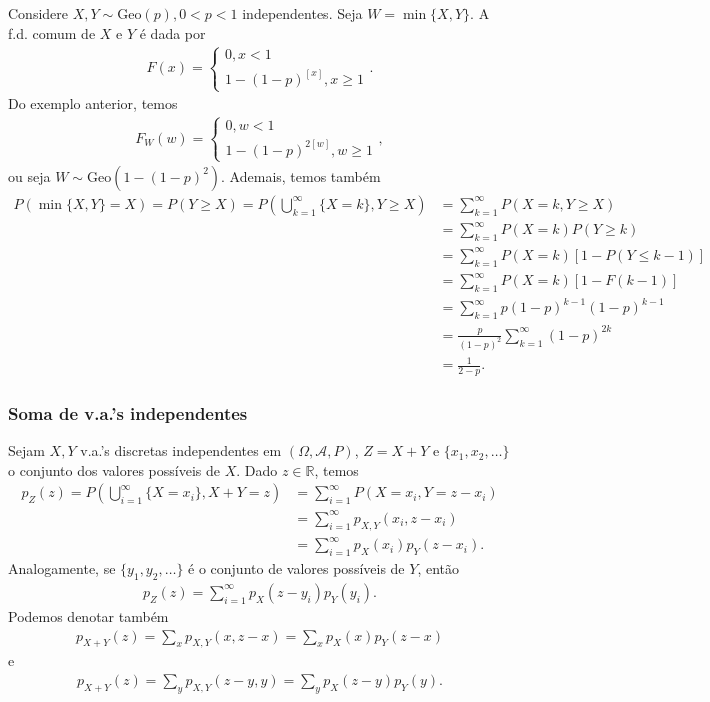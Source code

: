 \documentclass[../Notas.tex]{subfiles}
\begin{document}
\begin{example}
Considere $X,Y\sim\text{Geo}(p), 0 < p < 1$ independentes. Seja $W = \min\{X,Y\}$. A f.d. comum de $X$ e $Y$ é dada por
\begin{align*}
    F(x) = \begin{cases}
    0, x<1 \\
    1 - (1-p)^{[x]}, x\geq 1
    \end{cases}.
\end{align*}
Do exemplo anterior, temos
\begin{align*}
    F_W(w) = \begin{cases}
    0, w<1 \\
    1 - (1-p)^{2[w]}, w\geq 1
    \end{cases},
\end{align*}
ou seja $W\sim\text{Geo}(1 - (1-p)^2)$. Ademais, temos também
\begin{align*}
    P(\min\{ X,Y \} = X) = P(Y\geq X) = P\left( \bigcup_{k=1}^{\infty}\{X=k\}, Y\geq X \right) &= \sum_{k=1}^{\infty}P(X=k, Y\geq X) \\ 
    &= \sum_{k=1}^{\infty} P(X=k)P(Y\geq k) \\
    &= \sum_{k=1}^{\infty} P(X=k)[1 - P(Y\leq k-1)] \\
    &= \sum_{k=1}^{\infty} P(X=k)[1 - F(k-1)] \\
    &= \sum_{k=1}^{\infty} p(1-p)^{k-1}(1-p)^{k-1} \\
    &= \frac{p}{(1-p)^2}\sum_{k=1}^{\infty}(1-p)^{2k} \\
    &= \frac{1}{2-p}.
\end{align*}
\end{example}

\subsubsection{Soma de v.a.'s independentes}
Sejam $X, Y$ v.a.'s discretas independentes em $(\Omega, \mathcal{A}, P)$, $Z = X+Y$ e $\{x_1, x_2, \dots\}$ o conjunto dos valores possíveis de $X$. Dado $z\in\mathbb{R}$, temos
\begin{align*}
    p_Z(z) = P\left( \bigcup_{i=1}^{\infty}\{X=x_i\}, X+Y=z \right) &= \sum_{i=1}^{\infty} P(X=x_i, Y=z-x_i) \\
    &= \sum_{i=1}^{\infty} p_{X,Y}(x_i, z-x_i) \\
    &= \sum_{i=1}^{\infty} p_X(x_i)p_Y(z-x_i).
\end{align*}
Analogamente, se $\{y_1, y_2, \dots\}$ é o conjunto de valores possíveis de $Y$, então
\begin{align*}
    p_Z(z) = \sum_{i=1}^{\infty} p_X(z-y_i)p_Y(y_i).
\end{align*}
Podemos denotar também
\begin{align*}
    p_{X+Y}(z) = \sum_x p_{X,Y}(x,z-x) = \sum_x p_X(x)p_Y(z-x)
\end{align*}
e
\begin{align*}
    p_{X+Y}(z) = \sum_y p_{X,Y}(z-y,y) = \sum_y p_X(z-y)p_Y(y).
\end{align*}
\end{document}
